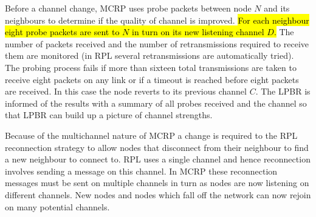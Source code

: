 Before a channel change, MCRP uses probe packets between node $N$ and its neighbours to determine if the quality of channel is improved.  \hl{For each neighbour eight probe packets are sent to $N$ in turn on its new listening channel $D$. } The number of packets received and the number of retransmissions required to receive them are monitored (in RPL several retransmissions are automatically tried).  The probing process fails if more than sixteen total transmissions are taken to receive eight packets on any link or if a timeout is reached before eight packets are received. In this case the node reverts to its previous channel $C$.  The LPBR is informed of the results with a summary of all probes received and the channel so that LPBR can build up a picture of channel strengths.

Because of the multichannel nature of MCRP a change is required to the RPL reconnection strategy to allow nodes that disconnect from their neighbour to find a new neighbour to connect to.  RPL uses a single channel and hence reconnection involves sending a message on this channel.  In MCRP these reconnection messages must be sent on multiple channels in turn as nodes are now listening on different channels.  New nodes and nodes which fall off the network can now rejoin on many potential channels.
